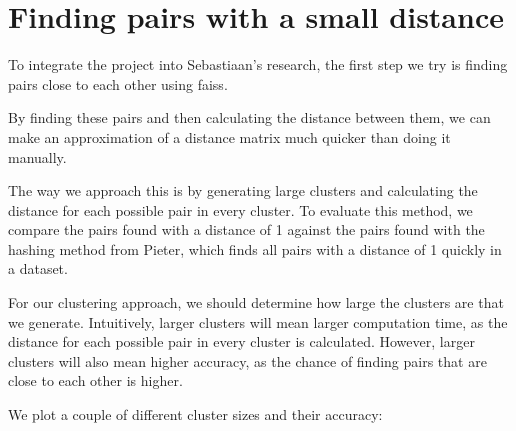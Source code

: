 \documentclass[11pt]{article}
\begin{document}
    \section{Finding pairs with a small distance}

    To integrate the project into Sebastiaan's research, the first step we try is finding pairs close to each other using
    faiss.

    By finding these pairs and then calculating the distance between them, we can make an approximation of a distance matrix
    much quicker than doing it manually.

    The way we approach this is by generating large clusters and calculating the distance for each possible pair in every cluster.
    To evaluate this method, we compare the pairs found with a distance of 1 against the pairs found with the hashing method from Pieter, which
    finds all pairs with a distance of 1 quickly in a dataset.

    For our clustering approach, we should determine how large the clusters are that we generate.
    Intuitively, larger clusters will mean larger computation time, as the distance for each possible pair in every cluster is calculated.
    However, larger clusters will also mean higher accuracy, as the chance of finding pairs that are close to each other is higher.

    We plot a couple of different cluster sizes and their accuracy:
\end{document}
